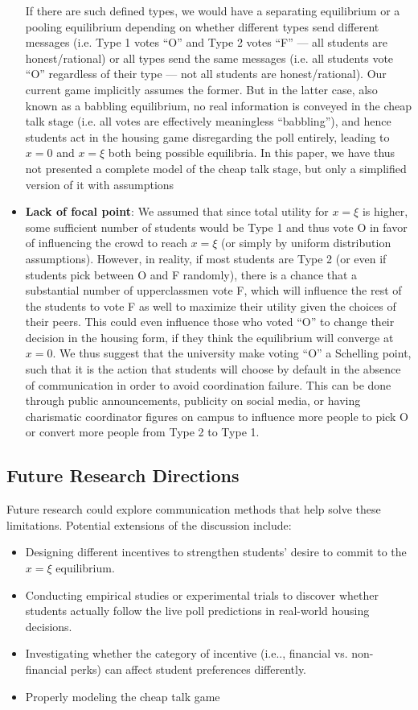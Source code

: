 \documentclass[12pt]{article}
\begin{document}
\begin{itemize}
    If there are such defined types, we would have a separating equilibrium or a pooling equilibrium depending on whether different types send different messages (i.e. Type 1 votes “O” and Type 2 votes “F” — all students are honest/rational) or all types send the same messages (i.e. all students vote “O” regardless of their type — not all students are honest/rational). Our current game implicitly assumes the former. But in the latter case, also known as a babbling equilibrium, no real information is conveyed in the cheap talk stage (i.e. all votes are effectively meaningless “babbling”), and hence students act in the housing game disregarding the poll entirely, leading to $x=0$ and $x=\xi$ both being possible equilibria. In this paper, we have thus not presented a complete model of the cheap talk stage, but only a simplified version of it with assumptions
    \item \textbf{Lack of focal point}: We assumed that since total utility for $x = \xi$ is higher, some sufficient number of students would be Type 1 and thus vote O in favor of influencing the crowd to reach $x=\xi$ (or simply by uniform distribution assumptions). However, in reality, if most students are Type 2 (or even if students pick between O and F randomly), there is a chance that a substantial number of upperclassmen vote F, which will influence the rest of the students to vote F as well to maximize their utility given the choices of their peers. This could even influence those who voted “O” to change their decision in the housing form, if they think the equilibrium will converge at $x=0$. We thus suggest that the university make voting “O” a Schelling point, such that it is the action that students will choose by default in the absence of communication in order to avoid coordination failure. This can be done through public announcements, publicity on social media, or having charismatic coordinator figures on campus to influence more people to pick O or convert more people from Type 2 to Type 1.
\end{itemize}
\subsection{Future Research Directions}
Future research could explore communication methods that help solve these limitations. Potential extensions of the discussion include:
\begin{itemize}
    \item Designing different incentives to strengthen students’ desire to commit to the $x  = \xi$    equilibrium.
    \item Conducting empirical studies or experimental trials to discover whether students actually follow the live poll predictions in real-world housing decisions.
    \item Investigating whether the category of incentive (i.e.., financial vs. non-financial perks) can affect student preferences differently.
    \item Properly modeling the cheap talk game
\end{itemize}
\end{document}
